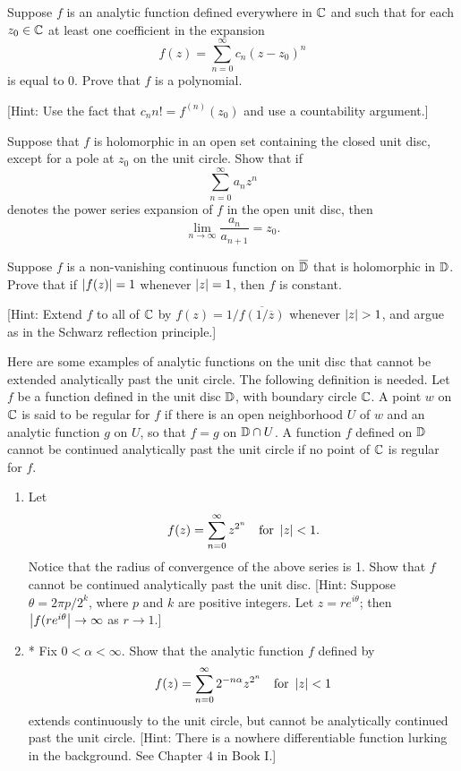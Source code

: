 \begin{exercise}
Suppose $f$ is an analytic function defined everywhere in $\mathbb{C}$ and such that for each $z_0\in\mathbb{C}$ at least one coefficient in the expansion $$f(z)=\sum_{n=0}^\infty c_n(z-z_0)^n$$ is equal to 0. Prove that $f$ is a polynomial.

[Hint: Use the fact that $c_nn! = f^{(n)}
(z_0)$ and use a countability argument.]
\end{exercise}

\begin{exercise}
Suppose that $f$ is holomorphic in an open set containing the closed unit disc,
except for a pole at $z_0$ on the unit circle. Show that if $$\sum_{n=0}^\infty a_nz^n$$ denotes the power series expansion of $f$ in the open unit disc, then $$\lim_{n\to\infty} \frac{a_n}{a_{n+1}} = z_0.$$
\end{exercise}

\begin{exercise}
Suppose $f$ is a non-vanishing continuous function on $\overline{\mathbb{D}}$ that is holomorphic in
$\mathbb{D}$. Prove that if $\left\lvert f(z) \right\rvert=1$ whenever $\left\lvert z \right\rvert = 1$, then $f$ is constant.

[Hint: Extend $f$ to all of $\mathbb{C}$ by $f(z)=1/\overline{f(1/\overline{z})}$ whenever $\left\lvert z \right\rvert > 1$, and argue as in
the Schwarz reflection principle.]
\end{exercise}


\begin{exercise}
Here are some examples of analytic functions on the unit disc that cannot be extended analytically past the unit circle. The following definition is needed. Let $f$ be a function defined in the unit disc $\mathbb{D}$, with boundary circle $\mathbb{C}$. A point $w$ on $\mathbb{C}$ is said to be regular for $f$ if there is an open neighborhood $U$ of $w$ and an analytic function $g$ on $U$, so that $f = g$ on $\mathbb{D}\cap U$. A function $f$ defined on $\mathbb{D}$ cannot be continued analytically past the unit circle if no point of $\mathbb{C}$ is regular for $f$.
\begin{enumerate}[label=(\alph*)]
\item Let $$f(z)=\sum_{n=0}^\infty z^{2^n} \quad \text{for }\left\lvert z \right\rvert<1.$$
Notice that the radius of convergence of the above series is 1. Show that $f$ cannot be continued analytically past the unit disc. [Hint: Suppose
$\theta = 2\pi p/2^k$, where $p$ and $k$ are positive integers. Let $z = re^{i\theta}$; then
$\left\lvert f(re^{i\theta} \right\rvert\to\infty$ as $r\to1$.]
\item * Fix $0<\alpha<\infty$. Show that the analytic function $f$ defined by $$f(z)=\sum_{n=0}^\infty 2^{-n\alpha}z^{2^n}\quad \text{for } \left\lvert z \right\rvert<1$$ extends continuously to the unit circle, but cannot be analytically continued past the unit circle. [Hint: There is a nowhere differentiable function lurking in the background. See Chapter 4 in Book I.]
\end{enumerate}
\end{exercise}

